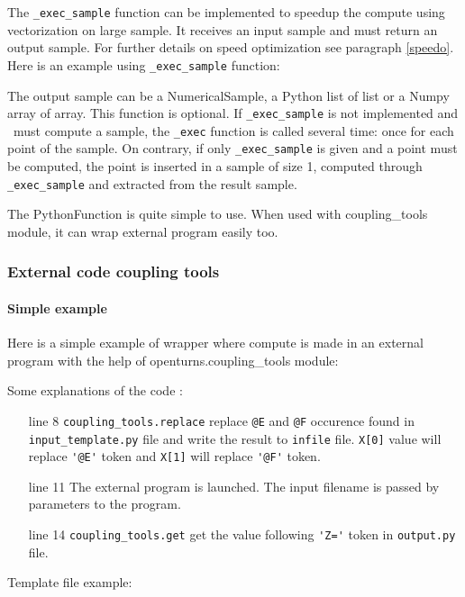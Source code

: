 The \verb|_exec_sample| function can be implemented to speedup the compute using vectorization on large sample. It receives an input sample and must return an output sample. For further details on speed optimization see paragraph \ref{speedo}. Here is an example using \verb|_exec_sample| function:


The output sample can be a NumericalSample, a Python list of list or a Numpy array of array. This function is optional.
If \verb|_exec_sample| is not implemented and \OT\ must compute a sample, the \verb|_exec| function is called several time: once for each point of the sample. On contrary, if only \verb|_exec_sample| is given and a point must be computed, the point is inserted in a sample of size 1, computed through \verb|_exec_sample| and extracted from the result sample.


The PythonFunction is quite simple to use. When used with coupling\_tools module, it can wrap external program easily too.


\subsubsection{External code coupling tools}


\paragraph{Simple example}

Here is a simple example of wrapper where compute is made in an external program with the help of openturns.coupling\_tools module:


Some explanations of the code :
\begin{itemize}
\item[line 8] \verb|coupling_tools.replace| replace \verb|@E| and \verb|@F| occurence found in \verb|input_template.py| file and write the result to \verb|infile| file. \verb|X[0]| value will replace \verb|'@E'| token and \verb|X[1]| will replace \verb|'@F'| token.
\item[line 11] The external program is launched. The input filename is passed by parameters to the program.
\item[line 14] \verb|coupling_tools.get| get the value following  \verb|'Z='| token in \verb|output.py| file.
\end{itemize}
Template file example:

